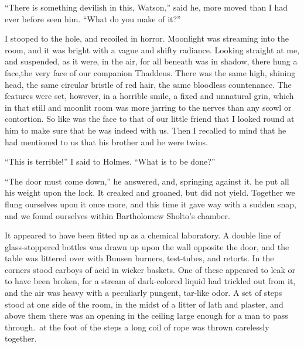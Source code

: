 \documentclass[12pt,english,oneside]{book}
\begin{document}
{}``There is something devilish in this, Watson,'' said he, more
moved than I had ever before seen him. {}``What do you make of it?''

I stooped to the hole, and recoiled in horror. Moonlight was streaming
into the room, and it was bright with a vague and shifty radiance.
Looking straight at me, and suspended, as it were, in the air, for
all beneath was in shadow, there hung a face,\mdsh{---}the very face
of our companion Thaddeus. There was the same high, shining head,
the same circular bristle of red hair, the same bloodless countenance.
The features were set, however, in a horrible smile, a fixed and unnatural
grin, which in that still and moonlit room was more jarring to the
nerves than any scowl or contortion. So like was the face to that
of our little friend that I looked round at him to make sure that
he was indeed with us. Then I recalled to mind that he had mentioned
to us that his brother and he were twins.

{}``This is terrible!'' I said to Holmes. {}``What is to be done?''

{}``The door must come down,'' he answered, and, springing against
it, he put all his weight upon the lock. It creaked and groaned, but
did not yield. Together we flung ourselves upon it once more, and
this time it gave way with a sudden snap, and we found ourselves within
Bartholomew Sholto's chamber.

It appeared to have been fitted up as a chemical laboratory. A double
line of glass-stoppered bottles was drawn up upon the wall opposite
the door, and the table was littered over with Bunsen burners, test-tubes,
and retorts. In the corners stood carboys of acid in wicker baskets.
One of these appeared to leak or to have been broken, for a stream
of dark-colored liquid had trickled out from it, and the air was heavy
with a peculiarly pungent, tar-like odor. A set of steps stood at
one side of the room, in the midst of a litter of lath and plaster,
and above them there was an opening in the ceiling large enough for
a man to pass through.\  at the foot of the steps a long coil of
rope was thrown carelessly together.
\end{document}
